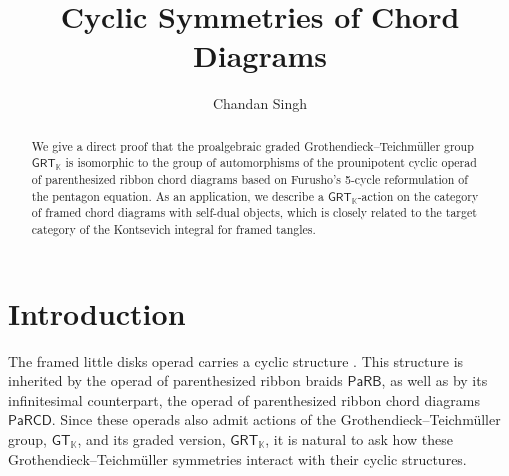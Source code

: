 \documentclass{amsart}
\title[Cyclic Symmetries of Chord Diagrams]{Cyclic Symmetries of Chord Diagrams}
\author[C. Singh]{Chandan Singh}
\newcommand{\kk}{\mathbb{K}}    %
\newcommand{\PaRB}{\mathsf{PaRB}}
\newcommand{\PaRCD}{\mathsf{PaRCD}}
\newcommand{\GT}{{\mathsf{GT}}}
\newcommand{\GRT}{{\mathsf{GRT}}}
\theoremstyle{definition}
\numberwithin{equation}{section}
\begin{document}

\begin{abstract}
We give a direct proof that the proalgebraic graded Grothendieck--Teichmüller group $\GRT_{\kk}$ is isomorphic to the group of automorphisms of the prounipotent cyclic operad of parenthesized ribbon chord diagrams based on Furusho’s 5-cycle reformulation of the pentagon equation. As an application, we describe a $\GRT_{\kk}$-action on the category of framed chord diagrams with self-dual objects, which is closely related to the target category of the Kontsevich integral for framed tangles.

\end{abstract}
\maketitle

\section*{Introduction}

The framed little disks operad carries a cyclic structure \cite{Budney}. This structure is inherited by the operad of parenthesized ribbon braids $\PaRB$, as well as by its infinitesimal counterpart, the operad of parenthesized ribbon chord diagrams $\PaRCD$. Since these operads also admit actions of the Grothendieck--Teichm\"uller group, $\GT_{\kk}$, and its graded version, $\GRT_{\kk}$, it is natural to ask how these Grothendieck--Teichm\"uller symmetries interact with their cyclic structures.
\end{document}
